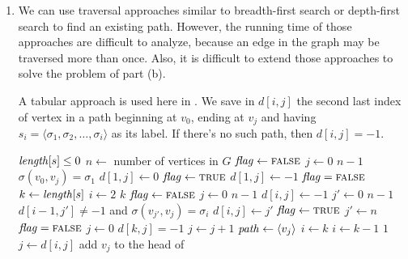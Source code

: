 \documentclass[a4paper, fleqn]{article}
\begin{document}
\begin{enumerate}
\renewcommand{\labelenumi}{\itshape \bfseries \alph{enumi}.}

\item  %

We can use traversal approaches similar to breadth-first search or
depth-first search to find an existing path. However, the running time
of those approaches are difficult to analyze, because an edge in the
graph may be traversed more than once. Also, it is difficult to extend
those approaches to solve the problem of part (b).

A tabular approach is used here in . We save in
$d[i,j]$ the second last index of vertex in a path beginning at $v_0$,
ending at $v_j$ and having $s_i = \langle \sigma_1, \sigma_2, \ldots,
\sigma_i \rangle$ as its label. If there's no such path, then $d[i,j]
= -1$.

\begin{codebox}
\li \If $\id{length}[s] \leq 0$
\li   \Then
        \Return {}
      \End
\li $n \gets$ number of vertices in $G$
\li $\id{flag} \gets \const{false}$
\li \For $j \gets 0$ \To $n-1$
\li   \Do
        \If $\sigma(v_0, v_j) = \sigma_1$
\li       \Then
            $d[1,j] \gets 0$
\li         $\id{flag} \gets \const{true}$
\li       \Else
            $d[1,j] \gets -1$
          \End
      \End
\li \If $\id{flag} = \const{false}$
\li   \Then
        \Return {} \label{Find-Path-Return-early}
      \End
\li $k \gets \id{length}[s]$
\li \For $i \gets 2$ \To $k$
\li   \Do
        $\id{flag} \gets \const{false}$
\li     \For $j \gets 0$ \To $n-1$
\li       \Do
            $d[i,j] \gets -1$
\li         \For $j' \gets 0$ \To $n-1$
\li           \Do
                \If $d[i-1,j'] \neq -1$ and
                    $\sigma(v_{j'}, v_j) = \sigma_i$
\li               \Then
                    $d[i,j] \gets j'$
\li                 $\id{flag} \gets \const{true}$
\li                 $j' \gets n$  
                  \End
              \End  %
          \End  %
\li     \If $\id{flag} = \const{false}$
\li       \Then
            \Return {}
          \End
      \End  %
\li $j \gets 0$           \label{Find-Path-construct-path-begin}
\li \While $d[k,j] = -1$
\li   \Do
        $j \gets j + 1$
      \End
\li $\id{path} \gets \langle v_j \rangle$
\li $i \gets k$
\li \For $i \gets k-1$ \Downto $1$
\li   \Do
        $j \gets d[i,j]$
\li     add $v_j$ to the head of 
      \End                \label{Find-Path-construct-path-end}
\li \Return {}
\end{codebox}


\end{enumerate}
\end{document}
